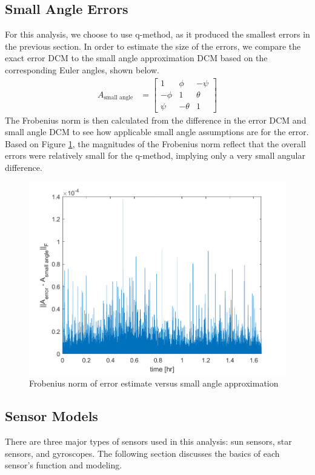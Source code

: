 \subsection{Small Angle Errors}
For this analysis, we choose to use q-method, as it produced the smallest errors in the previous section. In order to estimate the size of the errors, we compare the exact error DCM to the small angle approximation DCM based on the corresponding Euler angles, shown below.
\begin{align*}
    A_{\text{small angle}} &= 
    \begin{bmatrix}
        1 & \phi & -\psi \\
        -\phi & 1 & \theta \\
        \psi & -\theta & 1
    \end{bmatrix}
\end{align*}
The Frobenius norm is then calculated from the difference in the error DCM and small angle DCM to see how applicable small angle assumptions are for the error. Based on Figure \ref{fig:ps7_problem3}, the magnitudes of the Frobenius norm reflect that the overall errors were relatively small for the q-method, implying only a very small angular difference.

\begin{figure}[H]
\centering
\includegraphics[scale=0.6]{Images/ps7_problem3.png}
\caption{Frobenius norm of error estimate versus small angle approximation}
\label{fig:ps7_problem3}
\end{figure}

\subsection{Sensor Models}
There are three major types of sensors used in this analysis: sun sensors, star sensors, and gyroscopes. The following section discusses the basics of each sensor's function and modeling.

